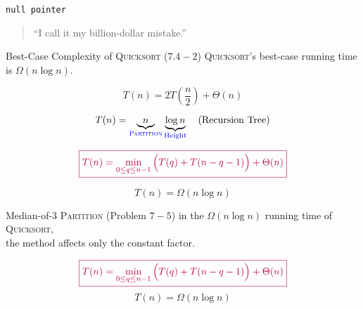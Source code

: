 
\begin{frame}{}
  \centerline{}

  \pause
  \centerline{\texttt{null pointer}}

  \pause
  \begin{quote}
    \centering
    ``I call it my billion-dollar mistake.''
  \end{quote}
\end{frame}

\begin{frame}{}
  \begin{exampleblock}{Best-Case Complexity of \textsc{Quicksort} ($7.4-2$)}
     \textsc{Quicksort}'s best-case running time is $\Omega(n \log n)$.
  \end{exampleblock}

  \pause
  \[
    T(n) = 2T(\frac{n}{2}) + \Theta(n)
  \]

  \pause
  \[
    T(n) = \underbrace{n}_{\textsc{\textcolor{blue}{Partition}}} \underbrace{\log n}_{\text{\textcolor{blue}{Height}}} \quad \text{(Recursion Tree)}
  \]

  \pause
  \vspace{0.30cm}
  \[
    \textcolor{purple}{\boxed{T(n) = \min_{0 \le q \le n-1} \Big( T(q) + T(n-q-1) \Big) + \Theta(n)}}
  \]

  \pause
  \[
    T(n) = \Omega(n \log n)
  \]

  \pause
  \centerline{}
\end{frame}

\begin{frame}{}
  \begin{exampleblock}{Median-of-3 \textsc{Partition} (Problem $7-5$)}
     in the $\Omega(n \log n)$ running time of \textsc{Quicksort}, \\
    the  method affects only the constant factor.
  \end{exampleblock}

  \pause

  \pause
  \[
    \textcolor{purple}{\boxed{T(n) = \min_{0 \le q \le n-1} \Big( T(q) + T(n-q-1) \Big) + \Theta(n)}}
  \]
  \[
    T(n) = \Omega(n \log n)
  \]
\end{frame}

\begin{frame}{}
\end{frame}
